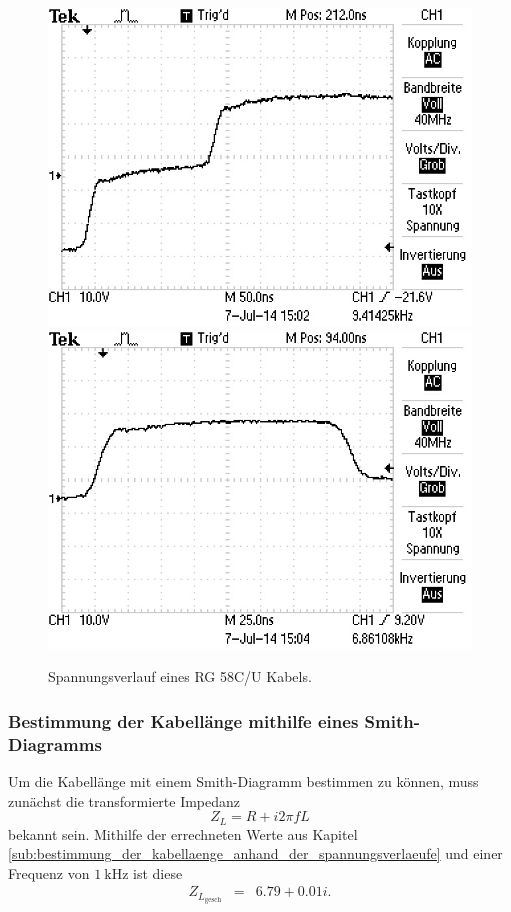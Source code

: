\begin{figure}
\centering
	\includegraphics[width = 12cm]{data/c/ALL0011/F0011TEK.jpg}
	\includegraphics[width = 12cm]{data/c/ALL0012/F0012TEK.jpg}
	\caption{Spannungsverlauf eines RG 58C/U Kabels.}
	\label{fig_zeit3}
\end{figure}

\FloatBarrier
\subsubsection{Bestimmung der Kabellänge mithilfe eines Smith-Diagramms} %
\label{sub:bestimmung_der_kabellaenge_mithilfe_eines_smith_diagramms}

Um die Kabellänge mit einem Smith-Diagramm bestimmen zu können, muss zunächst die transformierte Impedanz 
\begin{equation}
	Z_L = R + i 2 \pi f L
\end{equation}
bekannt sein.
Mithilfe der errechneten Werte aus Kapitel \ref{sub:bestimmung_der_kabellaenge_anhand_der_spannungsverlaeufe} und einer Frequenz von $\SI{1}{\kilo\hertz}$ ist diese
\begin{eqnarray}
	Z_{L_\text{gesch}} &=& 6.79 + 0.01i.
\end{eqnarray}

